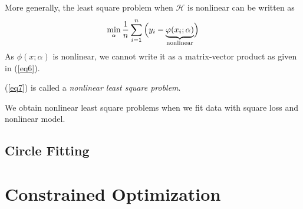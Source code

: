 More generally, the least square problem when $\mathcal{H}$ is nonlinear can be written as \begin{equation}\label{eq7} \min_\alpha\dfrac{1}{n}\sum_{i=1}^n\qty\Big(y_i-\underbrace{\varphi(x_i;\alpha)}_\text{nonlinear})\end{equation}
As $\phi(x;\alpha)$ is nonlinear, we cannot write it as a matrix-vector product as given in (\ref{eq6}). \par 
(\ref{eq7}) is called a \textit{nonlinear least square problem}.
\begin{rmk}
	We obtain nonlinear least square problems when we fit data with square loss and nonlinear model. 
\end{rmk}

\subsection{Circle Fitting}

\newpage
\section{Constrained Optimization}


